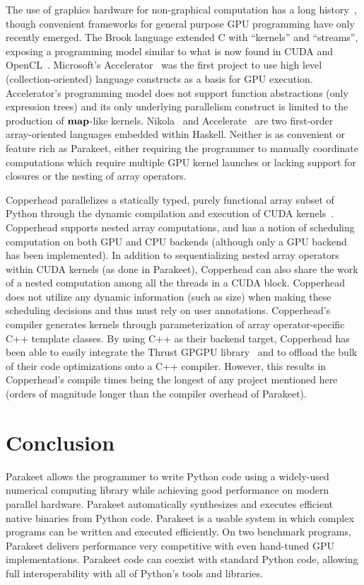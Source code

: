 \documentclass[10pt,twocolumn]{article}
\begin{document}
The use of graphics hardware for non-graphical computation has a long history~\cite{Leng90}, though convenient frameworks for general purpose GPU programming have only recently emerged. The Brook language extended C with ``kernels'' and ``streams'', exposing a programming model similar to what is now found in CUDA and OpenCL~\cite{Buck04}.  Microsoft's Accelerator~\cite{Tard06} was the first project to use high level (collection-oriented) language constructs as a basis for GPU execution. Accelerator's programming model does not support function abstractions (only expression trees) and its only underlying parallelism construct is limited to the production of $\mbox{\textbf{map}}$-like kernels.  Nikola~\cite{Main10} and Accelerate~\cite{Chak11} are two first-order array-oriented languages embedded within Haskell. Neither is as convenient or feature rich as Parakeet, either requiring the programmer to manually coordinate computations which require multiple GPU kernel launches or lacking support for closures or the nesting of array operators.

Copperhead parallelizes a statically typed, purely functional array subset of Python through the dynamic compilation and execution of CUDA kernels~\cite{Cata11}. Copperhead supports nested array computations, and has a notion of scheduling computation on both GPU and CPU backends (although only a GPU backend has been implemented). In addition to sequentializing nested array operators within CUDA kernels (as done in Parakeet), Copperhead can also share the work of a nested computation among all the threads in a CUDA block. Copperhead does not utilize any dynamic information (such as size) when making these scheduling decisions and thus must rely on user annotations. Copperhead's compiler generates kernels through parameterization of array operator-specific C++ template classes. By using C++ as their backend target, Copperhead has been able to easily integrate the Thrust GPGPU library~\cite{Hobe10} and to offload the bulk of their code optimizations onto a C++ compiler.  However, this results in Copperhead's compile times being the longest of any project mentioned here (orders of magnitude longer than the compiler overhead of Parakeet).

\section{Conclusion}
\label{Conclusion}
Parakeet allows the programmer to write Python code using a widely-used numerical computing library while achieving good performance on modern parallel hardware. Parakeet automatically synthesizes and executes efficient native binaries from Python code. Parakeet is a usable system in which complex programs can be written and executed efficiently.  On two benchmark programs, Parakeet delivers performance very competitive with even hand-tuned GPU implementations.  Parakeet code can coexist with standard Python code, allowing full interoperability with all of Python's tools and libraries.
\end{document}
